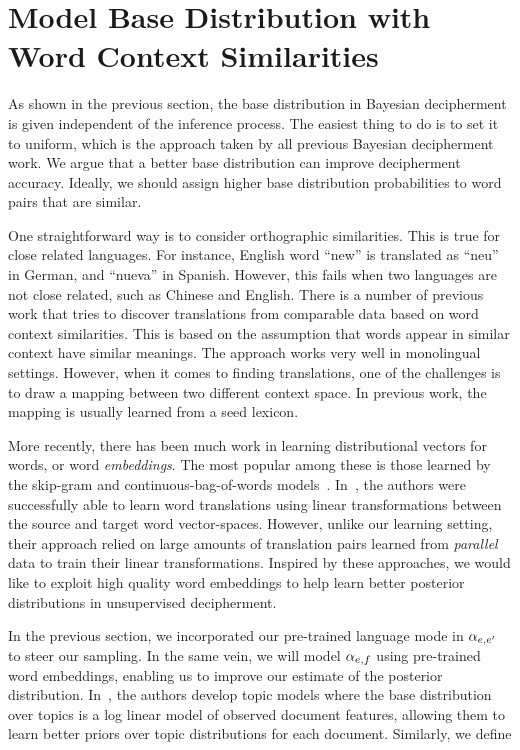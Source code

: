 \section{Model Base Distribution with Word Context Similarities}
As shown in the previous section, the base distribution in Bayesian decipherment is given independent of the inference process. The easiest thing to do is to set it to uniform, which is the approach taken by all previous Bayesian decipherment work. We argue that a better base distribution can improve decipherment accuracy. Ideally, we should assign higher base distribution probabilities to word pairs that are similar.

One straightforward way is to consider orthographic similarities. This is true for close related languages. For instance, English word ``new'' is translated as ``neu'' in German, and ``nueva'' in Spanish. However, this fails when two languages are not close related, such as Chinese and English. There is a number of previous work that tries to discover translations from comparable data based on word context similarities. This is based on the assumption that words appear in similar context have similar meanings. The approach works very well in monolingual settings. However, when it comes to finding translations, one of the challenges is to draw a mapping between two different context space. In previous work, the mapping is usually learned from a seed lexicon.

More recently, there has been much work in learning distributional vectors for words, or word \emph{embeddings}. The most popular among these is those learned by the skip-gram and continuous-bag-of-words models~\cite{mikolov2013efficient}. In~\cite{mikolov2013exploiting}, the authors were successfully able to learn word translations using linear transformations between the source and target word vector-spaces. However, unlike our learning setting, their approach relied on large amounts of translation pairs learned from \emph{parallel} data to train their linear transformations. Inspired by these approaches, we would like to exploit high quality word embeddings to help learn better posterior distributions in unsupervised decipherment. 

In the previous section, we incorporated our pre-trained language mode in $\alpha_{e,e'}$ to steer our sampling. In the same vein, we will model $\alpha_{e,f}$ using pre-trained word embeddings, enabling us to improve our estimate of the posterior distribution. In~\cite{mimno2012topic}, the authors develop topic models where the base distribution over topics is a log linear model of observed document features, allowing them to learn better priors over topic distributions for each document. Similarly, we define

